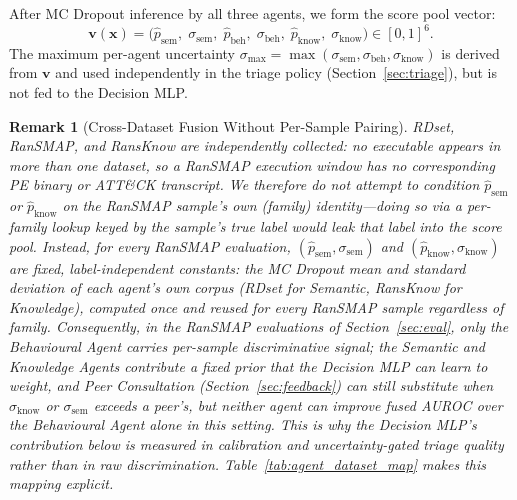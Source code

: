 \documentclass[journal]{IEEEtran}
\newtheorem{remark}{Remark}
\begin{document}
After MC Dropout inference by all three agents, we form the score pool vector:
\begin{equation}\label{eq:score_pool}
  \mathbf{v}(\mathbf{x}) = \bigl(
    \hat{p}_{\text{sem}},\; \sigma_{\text{sem}},\;
    \hat{p}_{\text{beh}},\; \sigma_{\text{beh}},\;
    \hat{p}_{\text{know}},\; \sigma_{\text{know}}
  \bigr) \in [0,1]^6.
\end{equation}
The maximum per-agent uncertainty $\sigma_{\max} =
\max(\sigma_{\text{sem}},\sigma_{\text{beh}},\sigma_{\text{know}})$
is derived from $\mathbf{v}$ and used independently in the triage
policy (Section~\ref{sec:triage}), but is not fed to the Decision MLP.

\begin{remark}[Cross-Dataset Fusion Without Per-Sample Pairing]\label{rem:corpus_mean}
RDset, RanSMAP, and RansKnow are independently collected: no executable
appears in more than one dataset, so a RanSMAP execution window has no
corresponding PE binary or ATT\&CK transcript. We therefore do not attempt
to condition $\hat{p}_{\text{sem}}$ or $\hat{p}_{\text{know}}$ on the
RanSMAP sample's own (family) identity---doing so via a per-family lookup
keyed by the sample's true label would leak that label into the score pool.
Instead, for every RanSMAP evaluation, $(\hat{p}_{\text{sem}},
\sigma_{\text{sem}})$ and $(\hat{p}_{\text{know}}, \sigma_{\text{know}})$ are
fixed, label-independent constants: the MC Dropout mean and standard
deviation of each agent's own corpus (RDset for Semantic, RansKnow for
Knowledge), computed once and reused for every RanSMAP sample regardless of
family. Consequently, in the RanSMAP evaluations of
Section~\ref{sec:eval}, only the Behavioural Agent carries per-sample
discriminative signal; the Semantic and Knowledge Agents contribute a fixed
prior that the Decision MLP can learn to weight, and Peer Consultation
(Section~\ref{sec:feedback}) can still substitute when
$\sigma_{\text{know}}$ or $\sigma_{\text{sem}}$ exceeds a peer's, but neither
agent can improve fused AUROC over the Behavioural Agent alone in this
setting. This is why the Decision MLP's contribution below is measured in
calibration and uncertainty-gated triage quality rather than in raw
discrimination. Table~\ref{tab:agent_dataset_map} makes this mapping
explicit.


\end{remark}
\end{document}
